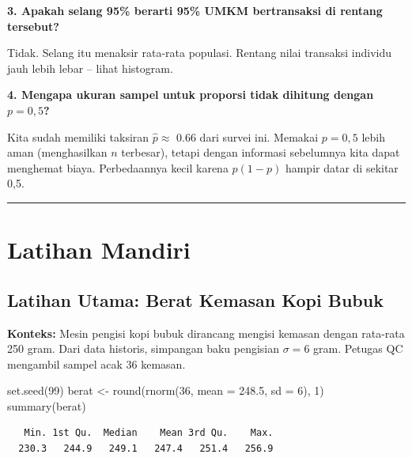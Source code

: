 \documentclass[
  indonesian,
  letterpaper,
]{book}
\newenvironment{Shaded}{\begin{snugshade}}{\end{snugshade}}
\newcommand{\AttributeTok}[1]{\textcolor[rgb]{0.40,0.45,0.13}{#1}}
\newcommand{\DecValTok}[1]{\textcolor[rgb]{0.68,0.00,0.00}{#1}}
\newcommand{\FloatTok}[1]{\textcolor[rgb]{0.68,0.00,0.00}{#1}}
\newcommand{\FunctionTok}[1]{\textcolor[rgb]{0.28,0.35,0.67}{#1}}
\newcommand{\NormalTok}[1]{\textcolor[rgb]{0.00,0.23,0.31}{#1}}
\newcommand{\OtherTok}[1]{\textcolor[rgb]{0.00,0.23,0.31}{#1}}
\begin{document}
\textbf{3. Apakah selang 95\% berarti 95\% UMKM bertransaksi di rentang
tersebut?}

Tidak. Selang itu menaksir rata-rata populasi. Rentang nilai transaksi
individu jauh lebih lebar -- lihat histogram.

\textbf{4. Mengapa ukuran sampel untuk proporsi tidak dihitung dengan
\(p = 0{,}5\)?}

Kita sudah memiliki taksiran \(\hat{p} \approx\) 0.66 dari survei ini.
Memakai \(p = 0{,}5\) lebih aman (menghasilkan \(n\) terbesar), tetapi
dengan informasi sebelumnya kita dapat menghemat biaya. Perbedaannya
kecil karena \(p(1-p)\) hampir datar di sekitar 0,5.

\begin{center}\rule{0.5\linewidth}{0.5pt}\end{center}


\chapter{Latihan Mandiri}\label{latihan-mandiri}

\section{Latihan Utama: Berat Kemasan Kopi
Bubuk}\label{latihan-utama-berat-kemasan-kopi-bubuk}

\textbf{Konteks:} Mesin pengisi kopi bubuk dirancang mengisi kemasan
dengan rata-rata 250 gram. Dari data historis, simpangan baku pengisian
\(\sigma = 6\) gram. Petugas QC mengambil sampel acak 36 kemasan.

\begin{Shaded}
\begin{Highlighting}[]
\FunctionTok{set.seed}\NormalTok{(}\DecValTok{99}\NormalTok{)}
\NormalTok{berat }\OtherTok{\textless{}{-}} \FunctionTok{round}\NormalTok{(}\FunctionTok{rnorm}\NormalTok{(}\DecValTok{36}\NormalTok{, }\AttributeTok{mean =} \FloatTok{248.5}\NormalTok{, }\AttributeTok{sd =} \DecValTok{6}\NormalTok{), }\DecValTok{1}\NormalTok{)}
\FunctionTok{summary}\NormalTok{(berat)}
\end{Highlighting}
\end{Shaded}

\begin{verbatim}
   Min. 1st Qu.  Median    Mean 3rd Qu.    Max. 
  230.3   244.9   249.1   247.4   251.4   256.9 
\end{verbatim}
\end{document}
